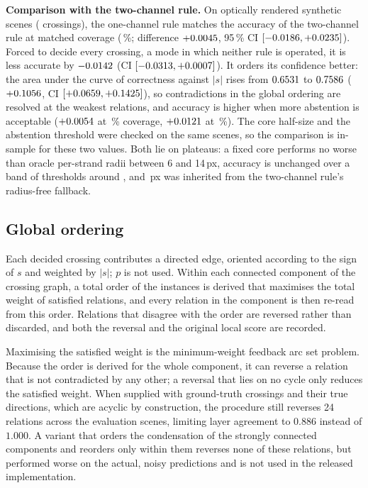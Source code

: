 \textbf{Comparison with the two-channel rule.} On
\PlectaDepthRuleHeldoutScenes{} optically rendered synthetic scenes
(\PlectaDepthRuleHeldoutCrossings{} crossings), the one-channel rule matches
the accuracy of the two-channel rule at matched coverage
(\PlectaDepthRuleCovShipped{}\,\%; difference $+0.0045{}$,
95\,\% CI $[-0.0186,+0.0235]{}$). Forced to decide every crossing, a mode
in which neither rule is operated, it is less accurate by
$-0.0142{}$ (CI $[-0.0313,+0.0007]{}$). It orders
its confidence better: the area under the curve of correctness against
$\lvert s\rvert$ rises from $0.6531{}$ to
$0.7586{}$ ($+0.1056{}$, CI
$[+0.0659,+0.1425]{}$), so contradictions in the global ordering are
resolved at the weakest relations, and accuracy is higher when more abstention
is acceptable ($+0.0054{}$ at
\PlectaDepthRuleCovAPct{}\,\% coverage, $+0.0121{}$ at
\PlectaDepthRuleCovBPct{}\,\%). The core half-size and the abstention
threshold were checked on the same scenes, so the comparison is in-sample for
these two values. Both lie on plateaus: a fixed core performs no worse than
oracle per-strand radii between 6 and 14\,px, accuracy is unchanged over a
band of thresholds around \PlectaParamAbstainScore{}, and
\PlectaParamCorePx{}\,px was inherited from the two-channel rule's radius-free
fallback.

\subsection{Global ordering}

Each decided crossing contributes a directed edge, oriented according to the
sign of $s$ and weighted by $\lvert s\rvert$; $p$ is not used. Within each
connected component of the crossing graph, a total order of the instances is
derived that maximises the total weight of satisfied relations, and every
relation in the component is then re-read from this order. Relations that
disagree with the order are reversed rather than discarded, and both the
reversal and the original local score are recorded.

Maximising the satisfied weight is the minimum-weight feedback arc set
problem. Because the order is derived for the whole component, it can reverse
a relation that is not contradicted by any other; a reversal that lies on no
cycle only reduces the satisfied weight. When supplied with ground-truth crossings and their true
directions, which are acyclic by construction, the procedure still reverses 24
relations across the \PlectaDepthRuleHeldoutScenes{} evaluation scenes,
limiting layer agreement to $0.886$ instead of $1.000$. A variant that orders
the condensation of the strongly connected components and reorders only within
them reverses none of these relations, but performed worse on the actual,
noisy predictions and is not used in the released implementation.

